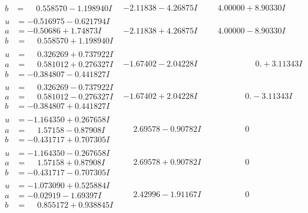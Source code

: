 \documentclass[1p]{elsarticle_modified}
\theoremstyle{definition}
\begin{document}
$$\begin{array}{c|c|c}
\begin{aligned}
b &= \phantom{-}0.558570 - 1.198940 I\end{aligned}
 & -2.11838 - 4.26875 I & \phantom{-}4.00000 + 8.90330 I \\ \hline\begin{aligned}
u &= -0.516975 - 0.621794 I \\
a &= -0.50686 + 1.74873 I \\
b &= \phantom{-}0.558570 + 1.198940 I\end{aligned}
 & -2.11838 + 4.26875 I & \phantom{-}4.00000 - 8.90330 I \\ \hline\begin{aligned}
u &= \phantom{-}0.326269 + 0.737922 I \\
a &= \phantom{-}0.581012 + 0.276327 I \\
b &= -0.384807 - 0.441827 I\end{aligned}
 & -1.67402 - 2.04228 I & \phantom{-0.000000 -}0. + 3.11343 I \\ \hline\begin{aligned}
u &= \phantom{-}0.326269 - 0.737922 I \\
a &= \phantom{-}0.581012 - 0.276327 I \\
b &= -0.384807 + 0.441827 I\end{aligned}
 & -1.67402 + 2.04228 I & \phantom{-0.000000 } 0. - 3.11343 I \\ \hline\begin{aligned}
u &= -1.164350 + 0.267658 I \\
a &= \phantom{-}1.57158 - 0.87908 I \\
b &= -0.431717 + 0.707305 I\end{aligned}
 & \phantom{-}2.69578 - 0.90782 I & \phantom{-0.000000 } 0 \\ \hline\begin{aligned}
u &= -1.164350 - 0.267658 I \\
a &= \phantom{-}1.57158 + 0.87908 I \\
b &= -0.431717 - 0.707305 I\end{aligned}
 & \phantom{-}2.69578 + 0.90782 I & \phantom{-0.000000 } 0 \\ \hline\begin{aligned}
u &= -1.073090 + 0.525884 I \\
a &= -0.02919 - 1.69397 I \\
b &= \phantom{-}0.855172 + 0.938845 I\end{aligned}
 & \phantom{-}2.42996 - 1.91167 I & \phantom{-0.000000 } 0 \\ \hline\begin{aligned}

\end{aligned}
\end{array}$$
\end{document}
